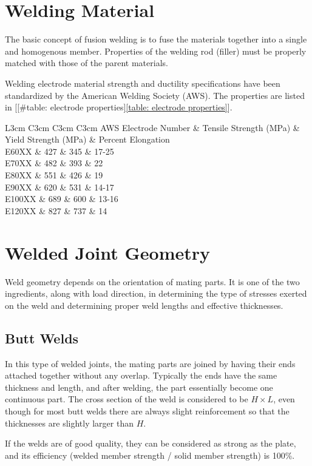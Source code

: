 \documentclass[a4paper,openany,12pt]{book}
\begin{document}
{{\section{Welding Material}
\label{welding-material}
The basic concept of fusion welding is to fuse the materials together
into a single and homogenous member. Properties of the welding rod
(filler) must be properly matched with those of the parent materials.

Welding electrode material strength and ductility specifications have
been standardized by the American Welding Society (AWS). The properties
are listed in
[[\#table: electrode properties]\ref{table: electrode properties}].


 L3cm C3cm C3cm C3cm AWS Electrode Number \& Tensile Strength (MPa) \&
Yield Strength (MPa) \& Percent Elongation\\
E60XX \& 427 \& 345 \& 17-25\\
E70XX \& 482 \& 393 \& 22\\
E80XX \& 551 \& 426 \& 19\\
E90XX \& 620 \& 531 \& 14-17\\
E100XX \& 689 \& 600 \& 13-16\\
E120XX \& 827 \& 737 \& 14\\

\section{Welded Joint Geometry}
\label{welded-joint-geometry}
Weld geometry depends on the orientation of mating parts. It is one of
the two ingredients, along with load direction, in determining the type
of stresses exerted on the weld and determining proper weld lengths and
effective thicknesses.

\subsection{Butt Welds}
\label{butt-welds}
In this type of welded joints, the mating parts are joined by having
their ends attached together without any overlap. Typically the ends
have the same thickness and length, and after welding, the part
essentially become one continuous part. The cross section of the weld is
considered to be \(H \times L\), even though for most butt welds there are
always slight reinforcement so that the thicknesses are slightly larger
than \(H\).


If the welds are of good quality, they can be considered as strong as
the plate, and its efficiency (welded member strength / solid member
strength) is 100\%.

}}
\end{document}
